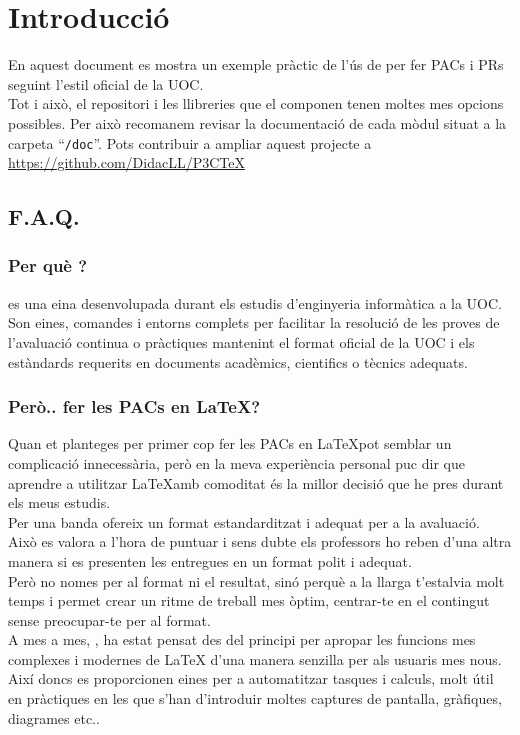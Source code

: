 \documentclass[cover,toc,default,diagrams]{P3CTeX} %
\begin{document}
\section*{Introducció} %

	En aquest document es mostra un exemple pràctic de l'ús de \PECTeX
	per fer PACs i PRs seguint l'estil oficial de la UOC.
	\bigskip\\ %
	Tot i això, el repositori \PECTeX i les llibreries que el componen
	tenen moltes mes opcions possibles. Per això recomanem revisar la
	documentació de cada mòdul situat a la carpeta ``\texttt{/doc}''. %
	Pots contribuir a ampliar aquest projecte a \url{https://github.com/DidacLL/P3CTeX}
	\subsection*{F.A.Q.}
	\pxHRule*[.6\linewidth] %
		\subsubsection*{Per què \PECTeX?}
			\PECTeX es una eina desenvolupada durant els estudis d'enginyeria informàtica a la UOC.
			 Son eines, comandes i entorns complets per facilitar la resolució de les proves de
			 l'avaluació continua o pràctiques mantenint el format oficial de la UOC i els estàndards
			 requerits en documents acadèmics, cientifics o tècnics adequats.
		\subsubsection*{Però.. fer les PACs en \LaTeX ?}
			Quan et planteges per primer cop fer les PACs en \LaTeX pot semblar un complicació innecessària,
			 però en la meva experiència personal puc dir que aprendre a utilitzar \LaTeX amb comoditat és
			 la millor decisió que he pres durant els meus estudis.
			\\
			Per una banda ofereix un format estandarditzat i adequat per a la avaluació. Això es valora a l'hora
			 de puntuar i sens dubte els professors ho reben d'una altra manera si es presenten les
			  entregues en un format polit i adequat.
			\\
			Però no nomes per al format ni el resultat, sinó perquè a la llarga t'estalvia molt temps i permet crear
			 un ritme de treball mes òptim, centrar-te en el contingut sense preocupar-te per al format.
			\bigskip\\
			A mes a mes, \PECTeX, ha estat pensat des del principi per apropar les funcions mes complexes i modernes de \LaTeX
			d'una manera senzilla per als usuaris mes nous. Així doncs es proporcionen eines per a automatitzar tasques i calculs,
			molt útil en pràctiques en les que s'han d'introduir moltes captures de pantalla, gràfiques, diagrames etc..
\end{document}
